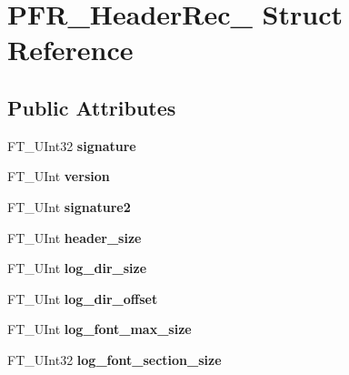 \hypertarget{struct_p_f_r___header_rec__}{}\section{P\+F\+R\+\_\+\+Header\+Rec\+\_\+ Struct Reference}
\label{struct_p_f_r___header_rec__}
\subsection*{Public Attributes}
\begin{DoxyCompactItemize}
\item 
\mbox{\label{struct_p_f_r___header_rec___a502bea0985013e23b982e8789547e958}} 
F\+T\+\_\+\+U\+Int32 {\bfseries signature}
\item 
\mbox{\label{struct_p_f_r___header_rec___a71a2ac357e975d39c1831e64dd080224}} 
F\+T\+\_\+\+U\+Int {\bfseries version}
\item 
\mbox{\label{struct_p_f_r___header_rec___af9b5d58adb7f3ea8bf471c48b358865c}} 
F\+T\+\_\+\+U\+Int {\bfseries signature2}
\item 
\mbox{\label{struct_p_f_r___header_rec___a52c0223534cefbb4f5c577fa2b9dbcd7}} 
F\+T\+\_\+\+U\+Int {\bfseries header\+\_\+size}
\item 
\mbox{\label{struct_p_f_r___header_rec___aedeb437f7c3ddb0021952662edd8b7ec}} 
F\+T\+\_\+\+U\+Int {\bfseries log\+\_\+dir\+\_\+size}
\item 
\mbox{\label{struct_p_f_r___header_rec___ad0aa4fd5f5d9503db9ab00fa549dd3e5}} 
F\+T\+\_\+\+U\+Int {\bfseries log\+\_\+dir\+\_\+offset}
\item 
\mbox{\label{struct_p_f_r___header_rec___a35d14dd3f3f4d43179eb539b9b3850bf}} 
F\+T\+\_\+\+U\+Int {\bfseries log\+\_\+font\+\_\+max\+\_\+size}
\item 
\mbox{\label{struct_p_f_r___header_rec___a4d37f0630949ce4821cc229efced289a}} 
F\+T\+\_\+\+U\+Int32 {\bfseries log\+\_\+font\+\_\+section\+\_\+size}

\end{DoxyCompactItemize}
